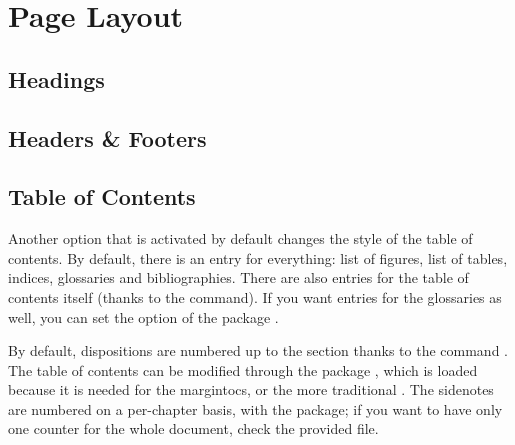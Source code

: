\setchapterpreamble[u]{\margintoc[*-6]}
\chapter{Page Layout}

\section{Headings}

\blindtext

\section{Headers \& Footers}

\blindtext

\section{Table of Contents}

Another option that is activated by default changes the style of the 
table of contents. By default, there is an entry for everything: list of 
figures, list of tables, indices, glossaries and bibliographies. There 
are also entries for the table of contents itself (thanks to the 
 command). If you want entries for the 
glossaries as well, you can set the  option of the package 
.

By default, dispositions are numbered up to the section thanks to the 
command . The table of contents 
can be modified through the package , which is loaded 
because it is needed for the margintocs, or the more traditional 
. The sidenotes are numbered on a per-chapter basis, 
with the  package; if you want to have only one 
counter for the whole document, check the provided  
file.


